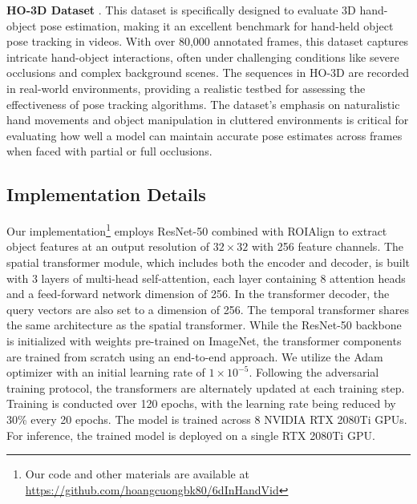 \noindent \textbf{HO-3D Dataset} \cite{hampali2020honnotate}. This dataset is specifically designed to evaluate 3D hand-object pose estimation, making it an excellent benchmark for hand-held object pose tracking in videos. With over 80,000 annotated frames, this dataset captures intricate hand-object interactions, often under challenging conditions like severe occlusions and complex background scenes. The sequences in HO-3D are recorded in real-world environments, providing a realistic testbed for assessing the effectiveness of pose tracking algorithms. The dataset's emphasis on naturalistic hand movements and object manipulation in cluttered environments is critical for evaluating how well a model can maintain accurate pose estimates across frames when faced with partial or full occlusions.

\subsection{Implementation Details}

Our implementation\footnote{Our code and other materials are available at \url{https://github.com/hoangcuongbk80/6dInHandVid}} employs ResNet-50 \cite{he2016deep} combined with ROIAlign \cite{he2017mask} to extract object features at an output resolution of $32 \times 32$ with 256 feature channels. The spatial transformer module, which includes both the encoder and decoder, is built with 3 layers of multi-head self-attention, each layer containing 8 attention heads and a feed-forward network dimension of 256. In the transformer decoder, the query vectors are also set to a dimension of 256. The temporal transformer shares the same architecture as the spatial transformer. While the ResNet-50 backbone is initialized with weights pre-trained on ImageNet, the transformer components are trained from scratch using an end-to-end approach. We utilize the Adam optimizer with an initial learning rate of $1 \times 10^{-5}$. Following the adversarial training protocol, the transformers are alternately updated at each training step. Training is conducted over 120 epochs, with the learning rate being reduced by 30\% every 20 epochs. The model is trained across 8 NVIDIA RTX 2080Ti GPUs. For inference, the trained model is deployed on a single RTX 2080Ti GPU.

